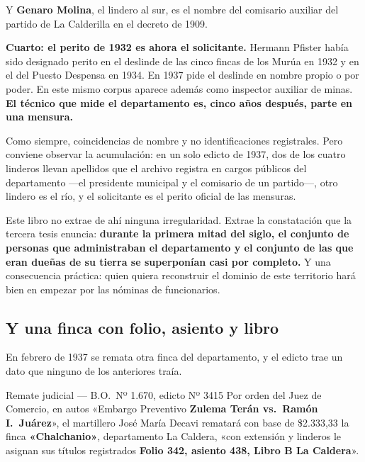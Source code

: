 Y \textbf{Genaro Molina}, el lindero al sur, es el nombre del comisario auxiliar del partido
de La Calderilla en el decreto de 1909.

\textbf{Cuarto: el perito de 1932 es ahora el solicitante.} Hermann Pfister había sido
designado perito en el deslinde de las cinco fincas de los Murúa en 1932 y en el del
Puesto Despensa en 1934. En 1937 pide el deslinde en nombre propio o por poder. En este mismo
corpus aparece además como inspector auxiliar de minas. \textbf{El técnico que mide el
departamento es, cinco años después, parte en una mensura.}

\begin{cautela}
Como siempre, coincidencias de nombre y no identificaciones registrales. Pero conviene
observar la acumulación: en un solo edicto de 1937, dos de los cuatro linderos llevan apellidos que el archivo registra en cargos públicos del departamento ---el presidente municipal y el comisario de un partido---, otro lindero es el río, y el solicitante es el perito oficial de las mensuras.

Este libro no extrae de ahí ninguna irregularidad. Extrae la constatación que la tercera
tesis enuncia: \textbf{durante la primera mitad del siglo, el conjunto de personas que
administraban el departamento y el conjunto de las que eran dueñas de su tierra se
superponían casi por completo.} Y una consecuencia práctica: quien quiera reconstruir el
dominio de este territorio hará bien en empezar por las nóminas de funcionarios.
\end{cautela}

\subsection*{Y una finca con folio, asiento y libro}

En febrero de 1937 se remata otra finca del departamento, y el edicto trae un dato que
ninguno de los anteriores traía.

\begin{ficha}{Remate judicial --- B.O.\ Nº 1.670, edicto Nº 3415}
Por orden del Juez de Comercio, en autos «Embargo Preventivo \textbf{Zulema Terán vs.\ Ramón
I.\ Juárez}», el martillero José María Decavi rematará con base de \$2.333,33 la finca
\textbf{«Chalchanio»}, departamento La Caldera, «con extensión y linderos le asignan sus
títulos registrados \textbf{Folio 342, asiento 438, Libro B La Caldera}».
\end{ficha}

